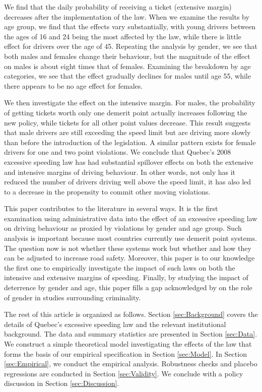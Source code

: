 We find that the daily probability of receiving a ticket (extensive margin) 
decreases after the implementation of the law. 
When we examine the results by age group, we find that the effects vary substantially, 
with young drivers between the ages of 16 and 24 being the most affected by the law, 
while there is little effect for drivers over the age of 45. 
Repeating the analysis by gender, we see that both males and females change their behaviour, 
but the magnitude of the effect on males is about eight times that of females. 
Examining the breakdown by age categories, we see that the effect gradually declines 
for males until age 55, while there appears to be no age effect for females. 

We then investigate the effect on the intensive margin. 
For males, the probability of getting tickets worth only one demerit point 
actually increases following the new policy, while tickets for all other point values decrease. 
This result suggests that male drivers are still exceeding the speed limit 
but are driving more slowly than before the introduction of the legislation. 
A similar pattern exists for female drivers for one and two point violations. 
%
We conclude that Quebec’s 2008 excessive speeding law has had substantial spillover effects 
on both the extensive and intensive margins of driving behaviour. 
In other words, not only has it reduced the number of drivers driving well above the speed limit, 
it has also led to a decrease in the propensity to commit other moving violations.

This paper contributes to the literature in several ways. 
It is the first examination using administrative data into the effect of 
an excessive speeding law on driving behaviour 
as proxied by violations by gender and age group. 
Such analysis is important because most countries currently use demerit point systems. 
The question now is not whether these systems work 
but whether and how they can be adjusted to increase road safety. 
Moreover, this paper is to our knowledge the first one to empirically investigate 
the impact of such laws on both the intensive and extensive margins of speeding. 
Finally, by studying the impact of deterrence by gender and age, 
this paper fills a gap acknowledged by 
\citet{freeman1999}
on the role of gender in studies surrounding criminality.


The rest of this article is organized as follows. 
Section \ref{sec:Background} covers the details of Quebec’s excessive speeding law 
and the relevant institutional background. 
The data and summary statistics are presented in Section \ref{sec:Data}. 
% 
We construct a simple theoretical model investigating the effects of the law
that forms the basis of our empirical specification in Section \ref{sec:Model}. 
% 
In Section \ref{sec:Empirical}, we conduct the empirical analysis. 
Robustness checks and placebo regressions are conducted in Section \ref{sec:Validity}. 
We conclude with a policy discussion in Section \ref{sec:Discussion}.

